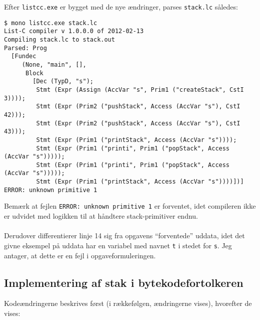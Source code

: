 Efter \texttt{listcc.exe} er bygget med de nye ændringer, parses \texttt{stack.lc} således:

\begin{verbatim}
$ mono listcc.exe stack.lc
List-C compiler v 1.0.0.0 of 2012-02-13
Compiling stack.lc to stack.out
Parsed: Prog
  [Fundec
     (None, "main", [],
      Block
        [Dec (TypD, "s");
         Stmt (Expr (Assign (AccVar "s", Prim1 ("createStack", CstI 3))));
         Stmt (Expr (Prim2 ("pushStack", Access (AccVar "s"), CstI 42)));
         Stmt (Expr (Prim2 ("pushStack", Access (AccVar "s"), CstI 43)));
         Stmt (Expr (Prim1 ("printStack", Access (AccVar "s"))));
         Stmt (Expr (Prim1 ("printi", Prim1 ("popStack", Access (AccVar "s")))));
         Stmt (Expr (Prim1 ("printi", Prim1 ("popStack", Access (AccVar "s")))));
         Stmt (Expr (Prim1 ("printStack", Access (AccVar "s"))))])]
ERROR: unknown primitive 1
\end{verbatim}

Bemærk at fejlen \texttt{ERROR: unknown primitive 1} er forventet, idet compileren ikke er udvidet med logikken til at håndtere stack-primitiver endnu.
\\\\
Derudover differentierer linje 14 sig fra opgavens ``forventede'' uddata, idet det givne eksempel på uddata har en variabel med navnet \texttt{t} i stedet for \texttt{s}. Jeg antager, at dette er en fejl i opgaveformuleringen.

\subsection{Implementering af stak i bytekodefortolkeren}

Kodeændringerne beskrives først (i rækkefølgen, ændringerne vises), hvorefter de vises:

